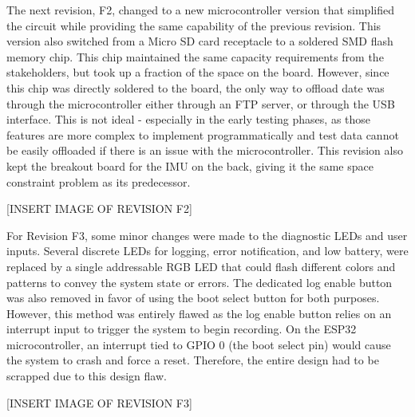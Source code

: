 The next revision, F2, changed to a new microcontroller version that simplified the circuit while providing the same capability of the previous revision.
This version also switched from a Micro SD card receptacle to a soldered SMD flash memory chip.
This chip maintained the same capacity requirements from the stakeholders, but took up a fraction of the space on the board.
However, since this chip was directly soldered to the board, the only way to offload date was through the microcontroller either through an FTP server, or through the USB interface.
This is not ideal - especially in the early testing phases, as those features are more complex to implement programmatically and test data cannot be easily offloaded if there is an issue with the microcontroller.
This revision also kept the breakout board for the IMU on the back, giving it the same space constraint problem as its predecessor.

[INSERT IMAGE OF REVISION F2]

For Revision F3, some minor changes were made to the diagnostic LEDs and user inputs.
Several discrete LEDs for logging, error notification, and low battery, were replaced by a single addressable RGB LED that could flash different colors and patterns to convey the system state or errors.
The dedicated log enable button was also removed in favor of using the boot select button for both purposes.
However, this method was entirely flawed as the log enable button relies on an interrupt input to trigger the system to begin recording.
On the ESP32 microcontroller, an interrupt tied to GPIO 0 (the boot select pin) would cause the system to crash and force a reset.
Therefore, the entire design had to be scrapped due to this design flaw.

[INSERT IMAGE OF REVISION F3]

